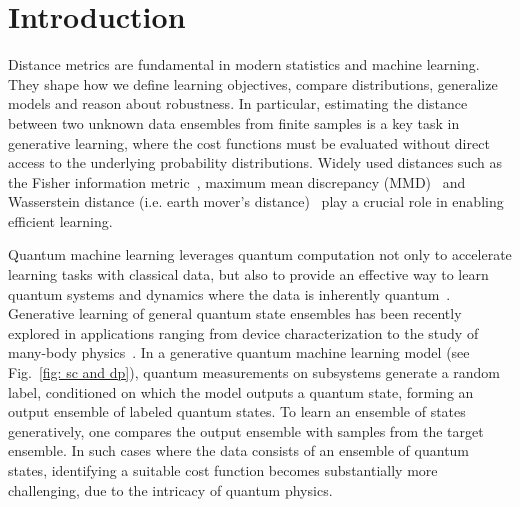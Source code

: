 \documentclass[aps,prx,reprint,superscriptaddress,amsmath,amssymb,longbibliography,floatfix]{revtex4-2}
\theoremstyle{plain}
\theoremstyle{definition}
\theoremstyle{remark}
\begin{document}
\maketitle

\section{Introduction}



Distance metrics are fundamental in modern statistics and machine learning. They shape how we define learning objectives, compare distributions, generalize models and reason about robustness.
In particular, estimating the distance between two unknown data ensembles from finite samples is a key task in generative learning, where the cost functions must be evaluated without direct access to the underlying probability distributions. Widely used distances such as the Fisher information metric~\citep{amari2016information}, maximum mean discrepancy (MMD)~\citep{MMD_JMLR:v13:gretton12a} and Wasserstein distance (i.e. earth mover's distance)~\citep{Wasserstein_villani2003topics} play a crucial role in enabling efficient learning. 

Quantum machine learning leverages quantum computation not only to accelerate learning tasks with classical data, but also to provide an effective way to learn quantum systems and dynamics where the data is inherently quantum~\cite{biamonte2017quantum,abbas2021power,cerezo2021variational}. 
Generative learning of general quantum state ensembles has been recently explored in applications ranging from device characterization to the study of many-body physics~\cite{QuDDPM_PhysRevLett.132.100602,tezuka2024generative}. In a generative quantum machine learning model (see Fig.~\ref{fig: sc and dp}), quantum measurements on subsystems generate a random label, conditioned on which the model outputs a quantum state, forming an output ensemble of labeled quantum states. To learn an ensemble of states generatively, one compares the output ensemble with samples from the target ensemble. In such cases where the data consists of an ensemble of quantum states, identifying a suitable cost function becomes substantially more challenging, due to the intricacy of quantum physics. 
\end{document}
